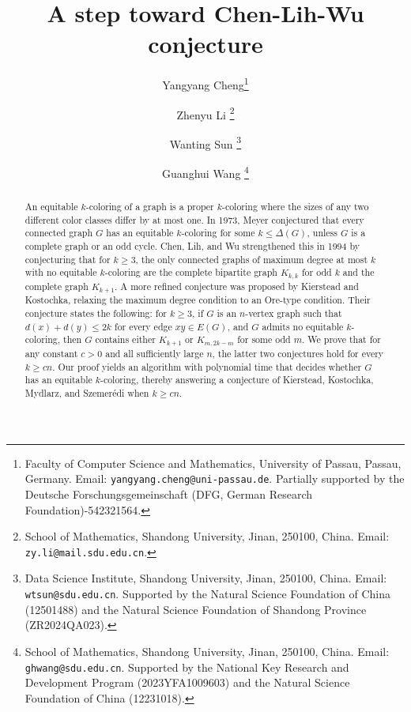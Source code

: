 \documentclass[11pt, a4paper]{article}
\title{A step toward Chen-Lih-Wu conjecture}
\author{
Yangyang Cheng\thanks{{Faculty of Computer Science and Mathematics, University of Passau, Passau, Germany. Email: {\tt yangyang.cheng@uni-passau.de}}. Partially supported by the Deutsche Forschungsgemeinschaft (DFG, German Research Foundation)-542321564.}
\and 
Zhenyu Li \thanks{School of Mathematics, Shandong University, Jinan, 250100, China. Email: {\tt zy.li@mail.sdu.edu.cn}.}
\and
Wanting Sun \thanks{Data Science Institute, Shandong University, Jinan, 250100, China. Email: {\tt wtsun@sdu.edu.cn}. Supported by the Natural Science Foundation of China (12501488) and the Natural Science Foundation of Shandong Province (ZR2024QA023).}
\and
Guanghui Wang \thanks{School of Mathematics, Shandong University, Jinan, 250100, China. Email: {\tt ghwang@sdu.edu.cn}. Supported by the National Key Research and Development Program (2023YFA1009603) and the Natural Science Foundation of China (12231018).
}
}
\date{}
\theoremstyle{definition}
\newcommand{\<}{\subseteq}
\begin{document}
\maketitle
\begin{abstract}
 An equitable $k$-coloring of a graph is a proper $k$-coloring where the sizes of any two different color classes differ by at most one. In 1973, Meyer conjectured that every connected graph $G$  has an equitable {$k$-coloring for some $k\leq \Delta(G)$}, unless $G$ is a complete graph or an odd cycle. Chen, Lih, and Wu strengthened this in 1994 by conjecturing that 
 for $k\geq 3$, the only connected graphs of maximum degree at most $k$ with no equitable $k$-coloring %
 are the complete bipartite graph $K_{k,k}$ for odd $k$ and the complete graph $K_{k+1}$. A more refined conjecture was proposed by Kierstead and Kostochka, relaxing the maximum degree condition to an Ore-type condition. %
 Their conjecture states the following: for $k\geq 3$, if $G$ is an $n$-vertex graph such that $d(x) + d(y)\leq 2k$ for every edge $xy\in E(G)$, and $G$ admits no equitable $k$-coloring, then $G$ contains either $K_{k+1}$ or $K_{m,2k-m}$ for some odd $m$. We prove that for any constant $c>0$ and all sufficiently large $n$, the latter two  conjectures hold for every $k\geq cn$. Our proof yields an algorithm with polynomial time 
that decides whether $G$ has an equitable $k$-coloring, thereby answering a conjecture of Kierstead, Kostochka, Mydlarz, and Szemer\'{e}di when $k \ge cn$. 
 
\end{abstract}
\maketitle
\end{document}
